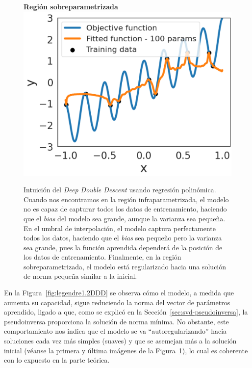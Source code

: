 \begin{figure}[h]
    \begin{minipage}{0.32\textwidth}
        \centering
        \textbf{Región sobreparametrizada} \\[0.5ex] 
        \includegraphics[width=\linewidth]{img/experiments/legendre1.3.png}
    \end{minipage}
    \caption[Intuición del \textit{Deep Double Descent} usando regresión polinómica.]{Intuición del \textit{Deep Double Descent} usando regresión polinómica. Cuando nos encontramos en la región infraparametrizada, el modelo no es capaz de capturar todos los datos de entrenamiento, haciendo que el \textit{bias} del modelo sea grande, aunque la varianza sea pequeña. En el umbral de interpolación, el modelo captura perfectamente todos los datos, haciendo que el \textit{bias} sea pequeño pero la varianza sea grande, pues la función aprendida dependerá de la posición de los datos de entrenamiento. Finalmente, en la región sobreparametrizada, el modelo está regularizado hacia una solución de norma pequeña similar a la inicial.}\label{fig:legendre1DD}
\end{figure}

En la Figura~\ref{fig:legendre1.2DDD} se observa cómo el modelo, a medida que aumenta su capacidad, sigue reduciendo la norma del vector de parámetros aprendido, ligado a que, como se explicó en la Sección~\ref{sec:svd-pseudoinversa}, la pseudoinversa proporciona la solución de norma mínima. No obstante, este comportamiento nos indica que el modelo se va ``autoregularizando'' hacia soluciones cada vez más simples (suaves) y que se asemejan más a la solución inicial (véanse la primera y última imágenes de la Figura~\ref{fig:legendre1DD}), lo cual es coherente con lo expuesto en la parte teórica.

